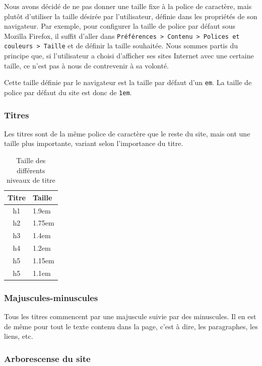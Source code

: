 \documentclass[letter, 11pt]{report}
\begin{document}
Nous avons décidé de ne pas donner une taille fixe à la police de caractère, mais plutôt d'utiliser la taille désirée par l'utilisateur, définie dans les propriétés de son navigateur. Par exemple, pour configurer la taille de police par défaut sous Mozilla Firefox, il suffit d'aller dans \texttt{Préférences > Contenu > Polices et couleurs > Taille} et de définir la taille souhaitée. Nous sommes partis du principe que, si l'utilisateur a choisi d'afficher ses sites Internet avec une certaine taille, ce n'est pas à nous de contrevenir à sa volonté.

Cette taille définie par le navigateur est la taille par défaut d'un \texttt{em}. La taille de police par défaut du site est donc de \texttt{1em}.

\subsubsection{Titres}
Les titres sont de la même police de caractère que le reste du site, mais ont une taille plus importante, variant selon l'importance du titre.

\begin{table}[h!tbp]
	\caption{Taille des différents niveaux de titre}
	\begin{center}
		\begin{tabular}{|c|l|}
			\hline
			Titre & Taille \\
			\hline
			h1    & 1.9em\\
			h2    & 1.75em\\
			h3    & 1.4em\\
			h4    & 1.2em\\
			h5    & 1.15em\\
			h5    & 1.1em\\
			\hline
		\end{tabular}
	\end{center}
\end{table}

\subsubsection{Majuscules-minuscules}

Tous les titres commencent par une majuscule suivie par des minuscules. Il en est de même pour tout le texte contenu dans la page, c'est à dire, les paragraphes, les liens, etc.

\subsubsection{Arborescense du site}
\end{document}
